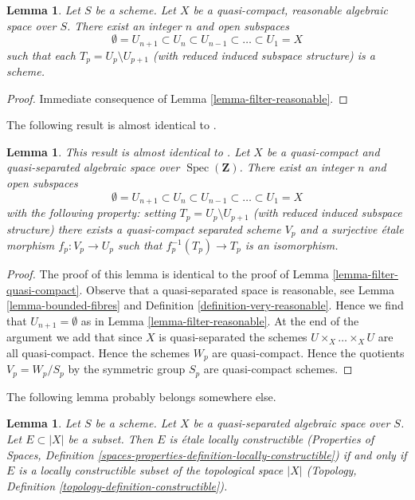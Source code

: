 \documentclass{stacks-project}
\newenvironment{reference}{\comment}{\endcomment}
\theoremstyle{plain}
\newtheorem{lemma}[subsection]{Lemma}
\theoremstyle{definition}
\theoremstyle{remark}
\numberwithin{equation}{subsection}
\def\Spec{\mathop{\mathrm{Spec}}}
\begin{document}
\begin{lemma}
\label{lemma-stratify-reasonable}
Let $S$ be a scheme. Let $X$ be a quasi-compact, reasonable algebraic space
over $S$. There exist an integer $n$ and open subspaces
$$
\emptyset = U_{n + 1} \subset
U_n \subset U_{n - 1} \subset \ldots \subset U_1 = X
$$
such that each $T_p = U_p \setminus U_{p + 1}$ (with reduced induced subspace
structure) is a scheme.
\end{lemma}

\begin{proof}
Immediate consequence of Lemma \ref{lemma-filter-reasonable}.
\end{proof}

\noindent
The following result is almost identical to
\cite[Proposition 5.7.8]{GruRay}.

\begin{lemma}
\label{lemma-filter-quasi-compact-quasi-separated}
\begin{reference}
This result is almost identical to \cite[Proposition 5.7.8]{GruRay}.
\end{reference}
Let $X$ be a quasi-compact and quasi-separated algebraic space over
$\Spec(\mathbf{Z})$. There exist an integer $n$ and open subspaces
$$
\emptyset = U_{n + 1} \subset
U_n \subset U_{n - 1} \subset \ldots \subset U_1 = X
$$
with the following property: setting $T_p = U_p \setminus U_{p + 1}$
(with reduced induced subspace structure) there exists a quasi-compact
separated scheme $V_p$ and a surjective \'etale morphism $f_p : V_p \to U_p$
such that $f_p^{-1}(T_p) \to T_p$ is an isomorphism.
\end{lemma}

\begin{proof}
The proof of this lemma is identical to the proof of
Lemma \ref{lemma-filter-quasi-compact}.
Observe that a quasi-separated space is reasonable, see
Lemma \ref{lemma-bounded-fibres} and
Definition \ref{definition-very-reasonable}.
Hence we find that $U_{n + 1} = \emptyset$ as in
Lemma \ref{lemma-filter-reasonable}.
At the end of the argument we add that since $X$ is quasi-separated
the schemes $U \times_X \ldots \times_X U$ are all quasi-compact.
Hence the schemes $W_p$ are quasi-compact. Hence the
quotients $V_p = W_p/S_p$ by the symmetric group $S_p$ are quasi-compact
schemes.
\end{proof}

\noindent
The following lemma probably belongs somewhere else.

\begin{lemma}
\label{lemma-locally-constructible}
Let $S$ be a scheme. Let $X$ be a quasi-separated algebraic space over $S$.
Let $E \subset |X|$ be a subset. Then $E$ is \'etale locally constructible
(Properties of Spaces, Definition
\ref{spaces-properties-definition-locally-constructible})
if and only if $E$ is a locally constructible subset of
the topological space $|X|$
(Topology, Definition \ref{topology-definition-constructible}).
\end{lemma}
\end{document}
